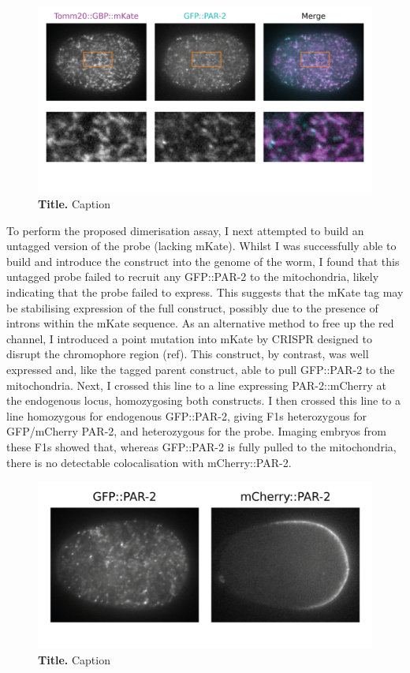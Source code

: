 \documentclass[12pt]{"article"}
\newcommand{\mycaption}[2]{\caption[#1]{\textbf{#1.} #2}}
\begin{document}
\begin{figure}[!h]
\includegraphics[scale=0.95]{tomm20_merge}
\setlength{\abovecaptionskip}{20pt}
\centering
\mycaption{Title}{Caption}
\label{fig:tomm20_merge}
\end{figure}

To perform the proposed dimerisation assay, I next attempted to build an untagged version of the probe (lacking mKate). Whilst I was successfully able to build and introduce the construct into the genome of the worm, I found that this untagged probe failed to recruit any GFP::PAR-2 to the mitochondria, likely indicating that the probe failed to express. This suggests that the mKate tag may be stabilising expression of the full construct, possibly due to the presence of introns within the mKate sequence. As an alternative method to free up the red channel, I introduced a point mutation into mKate by CRISPR designed to disrupt the chromophore region (ref). This construct, by contrast, was well expressed and, like the tagged parent construct, able to pull GFP::PAR-2 to the mitochondria. Next, I crossed this line to a line expressing PAR-2::mCherry at the endogenous locus, homozygosing both constructs. I then crossed this line to a line homozygous for endogenous GFP::PAR-2, giving F1s heterozygous for GFP/mCherry PAR-2, and heterozygous for the probe.  Imaging embryos from these F1s showed that, whereas GFP::PAR-2 is fully pulled to the mitochondria, there is no detectable colocalisation with mCherry::PAR-2.\\

\begin{figure}[!h]
\includegraphics[scale=1]{tomm20_assay}
\setlength{\abovecaptionskip}{20pt}
\centering
\mycaption{Title}{Caption}
\label{fig:tomm20_assay}
\end{figure}
\end{document}
